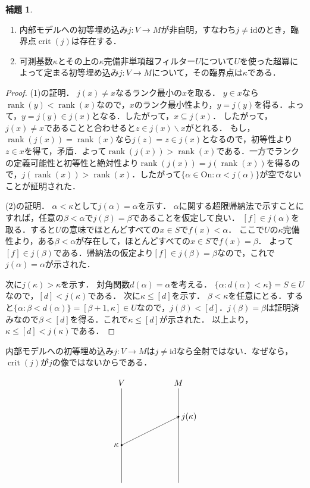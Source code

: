 \documentclass[uplatex]{jsarticle}
\newcommand{\Ordinals}{\mathrm{On}}
\newcommand{\rank}{\operatorname{rank}}
\newcommand{\id}{\mathrm{id}}
\newcommand{\crit}{\operatorname{crit}}
\renewcommand\subset{\subseteq}
\renewcommand{\setminus}{\smallsetminus}
\theoremstyle{definition}
\newtheorem{lem}[thm]{補題}
\begin{document}
	\begin{lem}
		\begin{enumerate}
			\item 内部モデルへの初等埋め込み$j \colon V \to M$が非自明，すなわち$j \ne \id$のとき，臨界点$\crit(j)$は存在する．
			\item 可測基数$\kappa$とその上の$\kappa$完備非単項超フィルター$U$について$U$を使った超冪によって定まる初等埋め込み$j \colon V \to M$について，その臨界点は$\kappa$である．
		\end{enumerate}
	\end{lem}
	\begin{proof}
		(1)の証明．
		$j(x) \ne x$なるランク最小の$x$を取る．
		$y \in x$なら$\rank(y) < \rank(x)$なので，$x$のランク最小性より，$y = j(y)$を得る．よって，$y = j(y) \in j(x)$となる．したがって，$x \subset j(x)$．
		したがって，$j(x) \ne x$であることと合わせると$z \in j(x) \setminus x$がとれる．
		もし，$\rank(j(x)) = \rank(x)$なら$j(z) = z \in j(x)$となるので，初等性より$z \in x$を得て，矛盾．よって$\rank(j(x)) > \rank(x)$である．一方でランクの定義可能性と初等性と絶対性より$\rank(j(x)) = j(\rank(x))$を得るので，$j(\rank(x)) > \rank(x)$．したがって$\{ \alpha \in \Ordinals : \alpha < j(\alpha) \}$が空でないことが証明された．
		
		(2)の証明．
		$\alpha < \kappa$として$j(\alpha) = \alpha$を示す．
		$\alpha$に関する超限帰納法で示すことにすれば，任意の$\beta < \alpha$で$j(\beta) = \beta$であることを仮定して良い．
		$[f] \in j(\alpha)$を取る．すると$U$の意味でほとんどすべての$x \in S$で$f(x) < \alpha$．
		ここで$U$の$\kappa$完備性より，ある$\beta < \alpha$が存在して，ほとんどすべての$x \in S$で$f(x) = \beta$．
		よって$[f] \in j(\beta)$である．帰納法の仮定より$[f] \in j(\beta) = \beta$なので，これで$j(\alpha) = \alpha$が示された．
		
		次に$j(\kappa) > \kappa$を示す．
		対角関数$d(\alpha) = \alpha$を考える．
		$\{ \alpha : d(\alpha) < \kappa \} = S \in U$なので，$[d] < j(\kappa)$である．
		次に$\kappa \le [d]$を示す．
		$\beta < \kappa$を任意にとる．すると$\{ \alpha : \beta < d(\alpha) \} = [\beta+1, \kappa] \in U$なので，$j(\beta) < [d]$．$j(\beta) = \beta$は証明済みなので$\beta < [d]$を得る．これで$\kappa \le [d]$が示された．
		以上より，$\kappa \le [d] < j(\kappa)$である．
	\end{proof}
	
	内部モデルへの初等埋め込み$j \colon V \to M$は$j \ne \id$なら全射ではない．なぜなら，$\crit(j)$が$j$の像ではないからである．
	
	\[
	\tikz[scale=0.8]{
		\draw (0, 0) -- (0, 5) node[above] {$V$};
		\draw (3, 0) -- (3, 5) node[above] {$M$};
		
		\fill(0,2) circle (0.05) node[left] {$\kappa$};
		\fill(3,3.5) circle (0.05) node[right] {$j(\kappa)$};
		\draw[->] (0,2) -- (3,3.5);
	}
	\]
	
\end{document}

